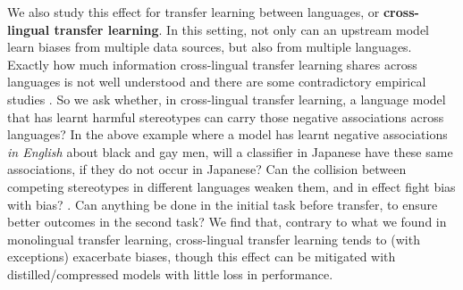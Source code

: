 We also study this effect for transfer learning between languages, or \textbf{cross-lingual transfer learning}. In this setting, not only can an upstream model learn biases from multiple data sources, but also from multiple languages. Exactly how much information cross-lingual transfer learning shares across languages is not well understood and there are some contradictory empirical studies \cite{}. So we ask whether, in cross-lingual transfer learning, a language model that has learnt harmful stereotypes can carry those negative associations across languages? In the above example where a model has learnt negative associations \textit{in English} about black and gay men, will a classifier in Japanese have these same associations, if they do not occur in Japanese? Can the collision between competing stereotypes in different languages weaken them, and in effect fight bias with bias? \citep{winomt}. Can anything be done in the initial task before transfer, to ensure better outcomes in the second task? We find that, contrary to what we found in monolingual transfer learning, cross-lingual transfer learning tends to (with exceptions) exacerbate biases, though this effect can be mitigated with distilled/compressed models with little loss in performance. 

